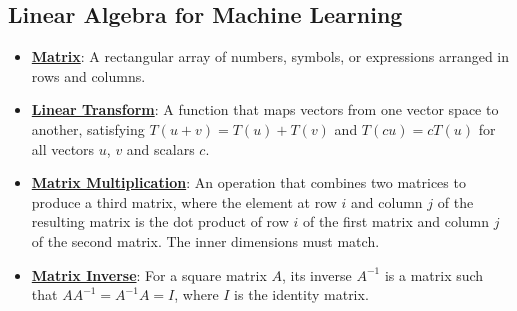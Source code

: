\documentclass{article}%
\begin{document}
\subsection{Linear Algebra for Machine Learning}%
\label{subsec:LinearAlgebraforMachineLearning}%
\begin{itemize}[leftmargin=*]%
\item \href{\url{https://purdue.brightspace.com/d2l/common/assets/pdfjs-d2l-dist/1.0.14-legacy/web/viewer.html?file=\%252Fcontent\%252Fenforced\%252F1095467-wl.202510.CS.24300.001\%252F04L1-Linear\%20Algebra\%20Primer.pdf\%253Fou\%253D1095467\&lang=en-us\&container=d2l-fileviewer-rendered-pdf\&fullscreen=d2l-fileviewer-rendered-pdf-dialog\&height=667}#page=4}{\textbf{Matrix}}: A rectangular array of numbers, symbols, or expressions arranged in rows and columns.%
\item \href{\url{https://purdue.brightspace.com/d2l/common/assets/pdfjs-d2l-dist/1.0.14-legacy/web/viewer.html?file=\%252Fcontent\%252Fenforced\%252F1095467-wl.202510.CS.24300.001\%252F04L1-Linear\%20Algebra\%20Primer.pdf\%253Fou\%253D1095467\&lang=en-us\&container=d2l-fileviewer-rendered-pdf\&fullscreen=d2l-fileviewer-rendered-pdf-dialog\&height=667}#page=5}{\textbf{Linear Transform}}: A function that maps vectors from one vector space to another, satisfying $T(u + v) = T(u) + T(v)$ and $T(cu) = cT(u)$ for all vectors $u$, $v$ and scalars $c$.%
\item \href{\url{https://purdue.brightspace.com/d2l/common/assets/pdfjs-d2l-dist/1.0.14-legacy/web/viewer.html?file=\%252Fcontent\%252Fenforced\%252F1095467-wl.202510.CS.24300.001\%252F04L1-Linear\%20Algebra\%20Primer.pdf\%253Fou\%253D1095467\&lang=en-us\&container=d2l-fileviewer-rendered-pdf\&fullscreen=d2l-fileviewer-rendered-pdf-dialog\&height=667}#page=14}{\textbf{Matrix Multiplication}}: An operation that combines two matrices to produce a third matrix, where the element at row $i$ and column $j$ of the resulting matrix is the dot product of row $i$ of the first matrix and column $j$ of the second matrix. The inner dimensions must match.%
\item \href{\url{https://purdue.brightspace.com/d2l/common/assets/pdfjs-d2l-dist/1.0.14-legacy/web/viewer.html?file=\%252Fcontent\%252Fenforced\%252F1095467-wl.202510.CS.24300.001\%252F04L1-Linear\%20Algebra\%20Primer.pdf\%253Fou\%253D1095467\&lang=en-us\&container=d2l-fileviewer-rendered-pdf\&fullscreen=d2l-fileviewer-rendered-pdf-dialog\&height=667}#page=10}{\textbf{Matrix Inverse}}: For a square matrix $A$, its inverse $A^{-1}$ is a matrix such that $AA^{-1} = A^{-1}A = I$, where $I$ is the identity matrix.%

\end{itemize}
\end{document}

